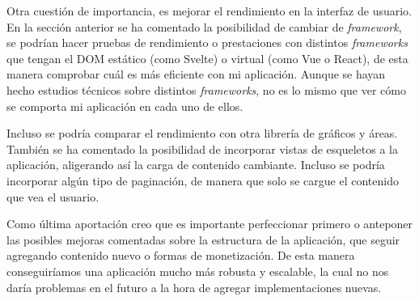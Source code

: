 Otra cuestión de importancia, es mejorar el rendimiento en la interfaz de usuario. En la sección anterior se ha comentado la posibilidad de cambiar de \textit{framework}, se podrían hacer pruebas de rendimiento o prestaciones con distintos \textit{frameworks} que tengan el DOM estático (como Svelte) o virtual (como Vue o React), de esta manera comprobar cuál es más eficiente con mi aplicación. Aunque se hayan hecho estudios técnicos sobre distintos \textit{frameworks}, no es lo mismo que ver cómo se comporta mi aplicación en cada uno de ellos.

\vspace{0.3cm}

Incluso se podría comparar el rendimiento con otra librería de gráficos y áreas. También se ha comentado la posibilidad de incorporar vistas de esqueletos a la aplicación, aligerando así la carga de contenido cambiante. Incluso se podría incorporar algún tipo de paginación, de manera que solo se cargue el contenido que vea el usuario.

\vspace{0.3cm}

Como última aportación creo que es importante perfeccionar primero o anteponer las posibles mejoras comentadas sobre la estructura de la aplicación, que seguir agregando contenido nuevo o formas de monetización. De esta manera conseguiríamos una aplicación mucho más robusta y escalable, la cual no nos daría problemas en el futuro a la hora de agregar implementaciones nuevas.